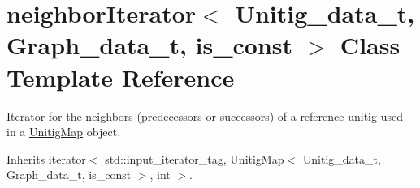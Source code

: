 \hypertarget{classneighborIterator}{}\section{neighbor\+Iterator$<$ Unitig\+\_\+data\+\_\+t, Graph\+\_\+data\+\_\+t, is\+\_\+const $>$ Class Template Reference}
\label{classneighborIterator}


Iterator for the neighbors (predecessors or successors) of a reference unitig used in a \hyperlink{classUnitigMap}{Unitig\+Map} object.  




Inherits iterator$<$ std\+::input\+\_\+iterator\+\_\+tag, Unitig\+Map$<$ Unitig\+\_\+data\+\_\+t, Graph\+\_\+data\+\_\+t, is\+\_\+const $>$, int $>$.

